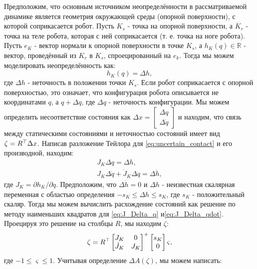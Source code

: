 Предположим, что основным источником неопределённости в рассматриваемой динамике является геометрия окружающей среды (опорной поверхности), с которой соприкасается робот. Пусть $K_s$ - точка на опорной поверхности, а $K_r$ - точка на теле робота, которая с ней соприкасается (т. е. точка на ноге робота). Пусть $e_K$ - вектор нормали к опорной поверхности в точке $K_s$, а $h_K(q) \in \mathbb{R}$ - вектор, проведённый из $K_r$ в $K_s$, спроецированный на $e_k$. Тогда мы можем моделировать неопределённость как:
%
\begin{equation}
	\label{eq:uncertain_contact}
	h_K(q) = \Delta h,
\end{equation}
%
где $\Delta h$ - неточность в положении точки $K_s$. Если робот соприкасается с опорной поверхностью, это означает, что конфигурация робота описывается не координатами $q$, а $q + \Delta q$, где $\Delta q$ - неточность конфигурации. Мы можем определить несоответствие состояния как 
$\Delta x = \begin{bmatrix}
	\Delta q \\ \Delta \dot q
\end{bmatrix}$
и находим, что связь между статическими состояниями и неточностью состояний имеет вид $\zeta = {R}^\top \Delta x$. Написав разложение Тейлора для \eqref{eq:uncertain_contact} и его производной, находим:
%
\begin{align} 
	\label{eq:J_Delta_q} 
	{J}_K \Delta q = \Delta h,
	\\
	\label{eq:J_Delta_qdot} 
	{J}_K \Delta \dot q + \dot{{J}}_K \Delta q = \Delta \dot h,
\end{align}
%
где ${J}_K = \partial h_K / \partial q$.
Предположим, что $\Delta \dot h = 0$ и $\Delta h$ - неизвестная скалярная переменная с областью определения $-s_K \leq \Delta h \leq s_K$, где $s_K$ - положительный скаляр. Тогда мы можем вычислить расхождение состояний как решение по методу наименьших квадратов для \eqref{eq:J_Delta_q} и\eqref{eq:J_Delta_qdot}. Проецируя это решение на столбцы $R$, мы находим $\zeta$:
%
\begin{align}
	\zeta = {R}^\top 
	\begin{bmatrix}
		{J}_K & 0 \\ \dot{{J}}_K & {J}_K
	\end{bmatrix}^+ 
	\begin{bmatrix}
		s_K \\ 0
	\end{bmatrix} \varsigma,
\end{align}
%
где $-1 \leq \varsigma \leq 1$. Учитывая определение $\Delta {A}(\zeta)$, мы можем написать:
